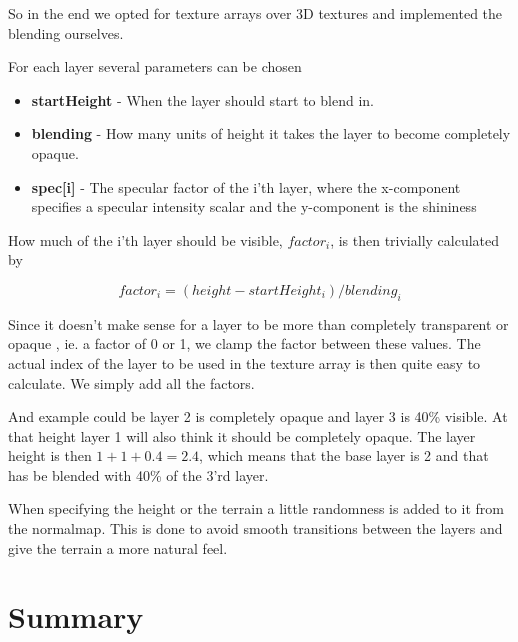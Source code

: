 So in the end we opted for texture arrays over 3D textures and
implemented the blending ourselves.

For each layer several parameters can be chosen

\newcommand{\layerProp}[2]{\item \textbf{#1} - #2}
\begin{itemize}
  \layerProp{startHeight}{When the layer should start to blend in.}
  \layerProp{blending}{How many units of height it takes the layer to
    become completely opaque.}
  \layerProp{spec[i]}{The specular factor of the i'th layer, where the
    x-component specifies a specular intensity scalar and the
    y-component is the shininess}
\end{itemize}

How much of the i'th layer should be visible, $factor_i$, is then
trivially calculated by

\begin{displaymath}
  factor_i = (height - startHeight_i) / blending_i
\end{displaymath}

Since it doesn't make sense for a layer to be more than completely
transparent or opaque , ie. a factor of 0 or 1, we clamp the factor
between these values. The actual index of the layer to be used in the
texture array is then quite easy to calculate. We simply add all the
factors. 

And example could be layer 2 is completely opaque and layer 3 is 40\%
visible. At that height layer 1 will also think it should be
completely opaque. The layer height is then $1 + 1 + 0.4 = 2.4$, which
means that the base layer is 2 and that has be blended with 40\% of
the 3'rd layer.


When specifying the height or the terrain a little randomness is added
to it from the normalmap. This is done to avoid smooth transitions
between the layers and give the terrain a more natural feel.

\section{Summary}









